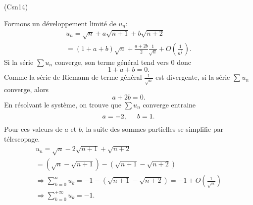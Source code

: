 \begin{tiny}(Csn14)\end{tiny} Formons un développement limité de $u_n$:
\begin{multline*}
 u_n = \sqrt{n} + a\sqrt{n+1} + b\sqrt{n+2} \\
 = (1+a+b)\sqrt{n} + \frac{a+2b}{2}\frac{1}{\sqrt{n}} + O(\frac{1}{n^{\frac{3}{2}}}).
\end{multline*}
Si la série $\sum u_n$ converge, son terme général tend vers $0$ donc
\[
 1 + a + b = 0.
\]
Comme la série de Riemann de terme général $\frac{1}{\sqrt{n}}$ est divergente, si la série $\sum u_n$ converge, alors
\[
 a + 2 b =0.
\]
 En résolvant le système, on trouve que $\sum u_n$ converge entraine 
\[
 a = -2, \hspace{0.5cm} b = 1.
\]
Pour ces valeurs de $a$ et $b$, la suite des sommes partielles se simplifie par télescopage.
\begin{multline*}
 u_n = \sqrt{n} - 2\sqrt{n+1} + \sqrt{n+2} \\
 = \left( \sqrt{n} - \sqrt{n+1}\right) - \left( \sqrt{n+1} - \sqrt{n+2}\right)\\
 \Rightarrow
 \sum_{k=0}^{n}u_k
 = -1 - \left( \sqrt{n+1} - \sqrt{n+2}\right)
 = -1 + O(\frac{1}{\sqrt{n}}) \\
\Rightarrow
\sum_{k=0}^{+\infty}u_k = -1.
\end{multline*}
